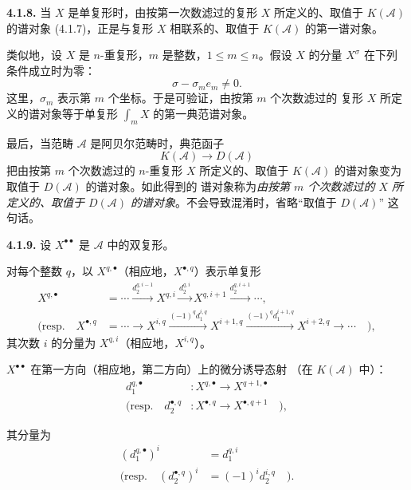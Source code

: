 \clearpage
{}%
\begingroup\small\setlength{\parskip}{0pt}\setlength{\emergencystretch}{1.5em}
\setlength{\abovedisplayskip}{4pt plus 2pt minus 2pt}%
\setlength{\belowdisplayskip}{4pt plus 2pt minus 2pt}%

\noindent\textbf{4.1.8.}\quad
当 $X$ 是单复形时，由按第一次数滤过的复形 $X$ 所定义的、取值于
$K(\mathcal A)$ 的谱对象 (4.1.7)，正是与复形 $X$ 相联系的、取值于
$K(\mathcal A)$ 的第一谱对象。

类似地，设 $X$ 是 $n$-重复形，$m$ 是整数，$1\leq m\leq n$。假设 $X$
的分量 $X^\sigma$ 在下列条件成立时为零：
\[
\sigma-\sigma_m e_m\neq0.
\]
这里，$\sigma_m$ 表示第 $m$ 个坐标。于是可验证，由按第 $m$ 个次数滤过的
复形 $X$ 所定义的谱对象等于单复形 $\int_m X$ 的第一典范谱对象。

最后，当范畴 $\mathcal A$ 是阿贝尔范畴时，典范函子
\[
K(\mathcal A)\longrightarrow D(\mathcal A)
\]
把由按第 $m$ 个次数滤过的 $n$-重复形 $X$ 所定义的、取值于
$K(\mathcal A)$ 的谱对象变为取值于 $D(\mathcal A)$ 的谱对象。如此得到的
谱对象称为\emph{由按第 $m$ 个次数滤过的 $X$ 所定义的、取值于
$D(\mathcal A)$ 的谱对象}。不会导致混淆时，省略“取值于 $D(\mathcal A)$”
这句话。

\medskip\noindent\textbf{4.1.9.}\quad
设 $X^{\bullet\bullet}$ 是 $\mathcal A$ 中的双复形。

对每个整数 $q$，以 $X^{q,\bullet}$（相应地，$X^{\bullet,q}$）表示单复形
\[
\begin{aligned}
X^{q,\bullet}
&=\cdots\xrightarrow{d_2^{q,i-1}}X^{q,i}
  \xrightarrow{d_2^{q,i}}X^{q,i+1}
  \xrightarrow{d_2^{q,i+1}}\cdots,\\[3pt]
(\text{resp.}\quad X^{\bullet,q}
&=\cdots\longrightarrow X^{i,q}
  \xrightarrow{(-1)^q d_1^{i,q}}X^{i+1,q}
  \xrightarrow{(-1)^q d_1^{i+1,q}}X^{i+2,q}
  \longrightarrow\cdots\quad),
\end{aligned}
\]
其次数 $i$ 的分量为 $X^{q,i}$（相应地，$X^{i,q}$）。

$X^{\bullet\bullet}$ 在第一方向（相应地，第二方向）上的微分诱导态射
（在 $K(\mathcal A)$ 中）：
\[
\begin{aligned}
d_1^{q,\bullet}&\colon X^{q,\bullet}\longrightarrow X^{q+1,\bullet}\\
(\text{resp.}\quad
d_2^{\bullet,q}&\colon X^{\bullet,q}\longrightarrow X^{\bullet,q+1}\quad),
\end{aligned}
\]

其分量为
\[
\begin{aligned}
(d_1^{q,\bullet})^i&=d_1^{q,i}\\
(\text{resp.}\quad(d_2^{\bullet,q})^i&=(-1)^i d_2^{i,q}\quad).
\end{aligned}
\]
\endgroup
